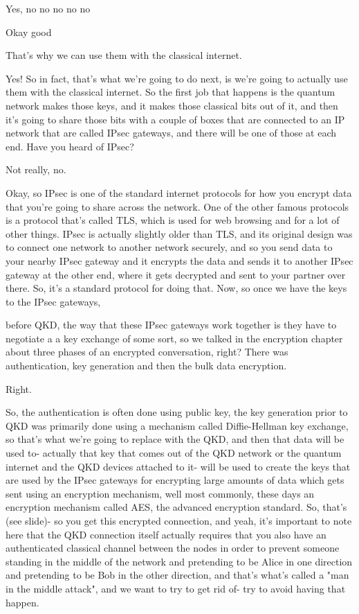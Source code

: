 Yes, no no no no no

Okay good

That's why we can use them with the classical internet.

Yes! So in fact, that's what we're going to do next, is we're going to actually use them with the classical internet. So the first job that happens is the quantum network makes those keys, and it makes those classical bits out of it, and then it's going to share those bits with a couple of boxes that are connected to an IP network that are called IPsec gateways, and there will be one of those at each end. Have you heard of IPsec?

Not really, no.

Okay, so IPsec is one of the standard internet protocols for how you encrypt data that you're going to share across the network. One of the other famous protocols is a protocol that's called TLS, which is used for web browsing and for a lot of other things. IPsec is actually slightly older than TLS, and its original design was to connect one network to another network securely, and so you send data to your nearby IPsec gateway and it encrypts the data and sends it to another IPsec gateway at the other end, where it gets decrypted and sent to your partner over there. So, it's a standard protocol for doing that. Now, so once we have the keys to the IPsec gateways,

before QKD, the way that these IPsec gateways work together is they have to negotiate a a key exchange of some sort, so we talked in the encryption chapter about three phases of an encrypted conversation, right? There was authentication, key generation and then the bulk data encryption.

Right.

So, the authentication is often done using public key, the key generation prior to QKD was primarily done using a mechanism called Diffie-Hellman key exchange, so that's what we're going to replace with the QKD, and then that data will be used to- actually that key that comes out of the QKD network or the quantum internet and the QKD devices attached to it- will be used to create the keys that are used by the IPsec gateways for encrypting large amounts of data which gets sent using an encryption mechanism, well most commonly, these days an encryption mechanism called AES, the advanced encryption standard. So, that's (see slide)- so you get this encrypted connection, and yeah, it's important to note here that the QKD connection itself actually requires that you also have an authenticated classical channel between the nodes in order to prevent someone standing in the middle of the network and pretending to be Alice in one direction and pretending to be Bob in the other direction, and that's what's called a "man in the middle attack", and we want to try to get rid of- try to avoid having that happen.

